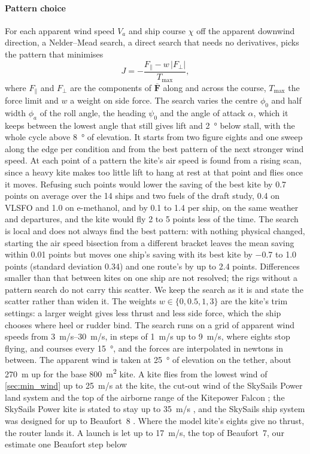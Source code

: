 \paragraph{Pattern choice} For each apparent wind speed $V_a$ and ship course $\chi$ off the apparent downwind direction, a Nelder--Mead search, a direct search that needs no derivatives, picks the pattern that minimises
\begin{equation}
J = -\frac{F_\parallel - w\,|F_\perp|}{T_\mathrm{max}},
\end{equation}
where $F_\parallel$ and $F_\perp$ are the components of $\overline{\mathbf F}$ along and across the course, $T_\mathrm{max}$ the force limit and $w$ a weight on side force. The search varies the centre $\phi_0$ and half width $\phi_a$ of the roll angle, the heading $\psi_0$ and the angle of attack $\alpha$, which it keeps between the lowest angle that still gives lift and \SI{2}{\degree} below stall, with the whole cycle above \SI{8}{\degree} of elevation. It starts from two figure eights and one sweep along the edge per condition and from the best pattern of the next stronger wind speed. At each point of a pattern the kite's air speed is found from a rising scan, since a heavy kite makes too little lift to hang at rest at that point and flies once it moves. Refusing such points would lower the saving of the best kite by \num{0.7} points on average over the 14 ships and two fuels of the draft study, \num{0.4} on VLSFO and \num{1.0} on e-methanol, and by \num{0.1} to \num{1.4} per ship, on the same weather and departures, and the kite would fly \num{2} to \num{5} points less of the time. The search is local and does not always find the best pattern: with nothing physical changed, starting the air speed bisection from a different bracket leaves the mean saving within \num{0.01} points but moves one ship's saving with its best kite by \num{-0.7} to \num{+1.0} points (standard deviation \num{0.34}) and one route's by up to \num{2.4} points. Differences smaller than that between kites on one ship are not resolved; the rigs without a pattern search do not carry this scatter. We keep the search as it is and state the scatter rather than widen it. The weights $w\in\{0, 0.5, 1, 3\}$ are the kite's trim settings: a larger weight gives less thrust and less side force, which the ship chooses where heel or rudder bind. The search runs on a grid of apparent wind speeds from \SIrange{3}{30}{m/s}, in steps of \SI{1}{m/s} up to \SI{9}{m/s}, where eights stop flying, and courses every \SI{15}{\degree}, and the forces are interpolated in newtons in between. The apparent wind is taken at \SI{25}{\degree} of elevation on the tether, about \SI{270}{m} up for the base \SI{800}{m^2} kite. A kite flies from the lowest wind of \cref{sec:min_wind} up to \SI{25}{m/s} at the kite, the cut-out wind of the SkySails Power land system \citep{skypower100_tib} and the top of the airborne range of the Kitepower Falcon \citep{kitepower2024}; the SkySails Power kite is stated to stay up to \SI{35}{m/s} \citep{skypower100_tib}, and the SkySails ship system was designed for up to Beaufort~8 \citep{noaa2009}. Where the model kite's eights give no thrust, the router lands it. A launch is let up to \SI{17}{m/s}, the top of Beaufort~7, our estimate one Beaufort step below 